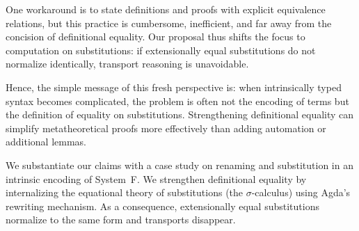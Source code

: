 \documentclass[manuscript,screen,review,anonymous,acmsmall]{acmart}
\begin{document}
One workaround is to state definitions and
proofs with explicit equivalence relations, but this practice is
cumbersome, inefficient, and far away from the concision of
definitional equality.
Our proposal thus shifts the focus to computation on substitutions: if extensionally equal
substitutions do not normalize identically, transport reasoning is unavoidable.




Hence, the simple message of this fresh perspective is: when intrinsically typed syntax
becomes complicated, the problem is often not the encoding of terms
but the definition of equality on substitutions. Strengthening
definitional equality can simplify metatheoretical proofs more effectively than
adding automation or additional lemmas.

We substantiate our claims with a case study on renaming and substitution in an
intrinsic encoding of System~F.
We strengthen definitional equality by internalizing the equational theory of substitutions
(the $\sigma$-calculus)
using Agda’s rewriting mechanism. As a
consequence, extensionally equal substitutions normalize to the same
form and transports disappear. 



\end{document}

